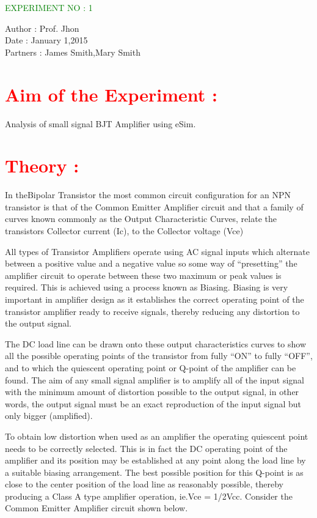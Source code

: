 \documentclass{article}
\begin{document}
\begin{center}
    \LARGE \textcolor{green}{EXPERIMENT NO : 1}
             
\end{center}

    Author   : Prof. Jhon\\
    Date     : January 1,2015\\
    Partners : James Smith,Mary Smith\\


\section*{\textcolor{red}{Aim of the Experiment :}}

Analysis of small signal BJT Amplifier using eSim.
    

\section*{\textcolor{red}{Theory :}}
In theBipolar Transistor the most common circuit configuration for an NPN transistor is that of the
Common Emitter Amplifier circuit and that a family of curves known commonly as the Output
Characteristic Curves, relate the transistors Collector current (Ic), to the Collector voltage (Vce)

All types of Transistor Amplifiers operate using AC signal inputs which alternate between a positive
value and a negative value so some way of “presetting” the amplifier circuit to operate between
these two maximum or peak values is required. This is achieved using a process known as Biasing.
Biasing is very important in amplifier design as it establishes the correct operating point of the
transistor amplifier ready to receive signals, thereby reducing any distortion to the output signal. \par 


The DC load line can be drawn onto these output characteristics curves to show all the possible
operating points of the transistor from fully “ON” to fully “OFF”, and to which the quiescent
operating point or Q-point of the amplifier can be found. The aim of any small signal amplifier is to
amplify all of the input signal with the minimum amount of distortion possible to the output signal,
in other words, the output signal must be an exact reproduction of the input signal but only bigger
(amplified). \par 


To obtain low distortion when used as an amplifier the operating quiescent point needs to be
correctly selected. This is in fact the DC operating point of the amplifier and its position may be
established at any point along the load line by a suitable biasing arrangement. The best possible
position for this Q-point is as close to the center position of the load line as reasonably possible,
thereby producing a Class A type amplifier operation, ie.Vce = 1/2Vcc. Consider the Common
Emitter Amplifier circuit shown below. \par 
\end{document}

